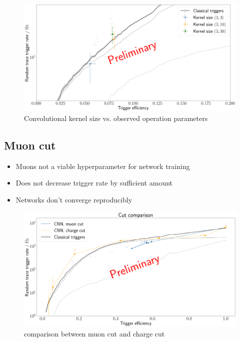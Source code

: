 \begin{figure}
	\centering
	\includegraphics[width=1\textwidth]{./plots/prelim/kernel_size.png}
	\caption{Convolutional kernel size vs. observed operation parameters}
\end{figure}

\subsection{Muon cut}
\label{ssec:muon-cut}

\begin{itemize}
	\item Muons not a viable hyperparameter for network training
	\item Does not decrease trigger rate by sufficient amount
	\item Networks don't converge reproducibly
\end{itemize}

\begin{figure}
	\centering
	\includegraphics[width=1\textwidth]{./plots/prelim/cut_comparison.png}
	\caption{comparison between muon cut and charge cut}
\end{figure}

